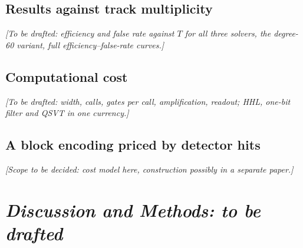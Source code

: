 \documentclass[11pt,a4paper]{article}
\begin{document}
\subsection{Results against track multiplicity}\label{sec:r3}
\textit{[To be drafted: efficiency and false rate against $T$ for all three solvers, the degree-60
variant, full efficiency--false-rate curves.]}

\subsection{Computational cost}\label{sec:r4}
\textit{[To be drafted: width, calls, gates per call, amplification, readout; HHL, one-bit filter and
QSVT in one currency.]}

\subsection{A block encoding priced by detector hits}\label{sec:r5}
\textit{[Scope to be decided: cost model here, construction possibly in a separate paper.]}

\clearpage
\section*{\textit{Discussion and Methods: to be drafted}}
\end{document}

